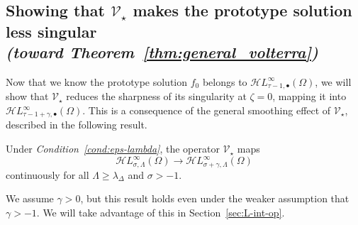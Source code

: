 \documentclass[final]{siamart220329}
\newcommand{\singexp}[2]{\mathcal{H}L^\infty_{#1, #2}}
\newcommand{\singexpalg}[1]{\singexp{#1}{\bullet}}
\newcommand{\softpart}{\mathcal{V}_\star}
\newcommand{\solproto}{f_0}
\newcommand{\domain}{\Omega}
\begin{document}
\subsection{Showing that $\softpart$ makes the prototype solution less singular \\ \textit{(toward Theorem~\ref{thm:general_volterra})}}\label{sec:image under soft_part}
Now that we know the prototype solution $\solproto$ belongs to $\singexpalg{\tau-1}(\domain)$, we will show that $\softpart$ reduces the sharpness of its singularity at $\zeta = 0$, mapping it into $\singexpalg{\tau-1+\gamma}(\domain)$. This is a consequence of the general smoothing effect of $\softpart$, described in the following result.

\begin{proposition}\label{prop:smoothing}
Under {\em Condition~\eqref{cond:eps-lambda}}, the operator $\softpart$ maps
\[ \singexp{\sigma}{\Lambda}(\Omega) \to \singexp{\sigma+\gamma}{\Lambda}(\Omega) \]
continuously for all $\Lambda\geq \lambda_{\Delta}$ and $\sigma>-1$.
\end{proposition}
\begin{rmk}
We assume $\gamma > 0$, but this result holds even under the weaker assumption that $\gamma > -1$. We will take advantage of this in Section~\ref{sec:L-int-op}.
\end{rmk}
\end{document}
